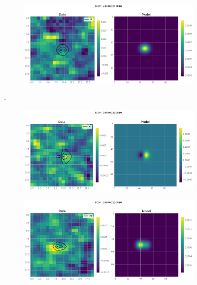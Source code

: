 \documentclass[
	a4paper, %
	10pt, %
	unnumberedsections, %
	twoside, %
]{LTJournalArticle}
\begin{document}
     \begin{figure}[H]
    \centering
    \begin{subfigure}{.47\textwidth}
        \includegraphics[width=\textwidth]{report/Figures/models/2204/20_psf_notconst.png}
    \end{subfigure}%
    \hspace{1em}-
    \begin{subfigure}{.47\textwidth}
        \centering
        \includegraphics[width=\textwidth]{report/Figures/models/2204/21_psf_notconst.png}
    \end{subfigure}
    \begin{subfigure}{.47\textwidth}
        \centering
        \includegraphics[width=\textwidth]{report/Figures/models/2204/22_psf_notconst.png}

\end{subfigure}
\end{figure}
\end{document}

